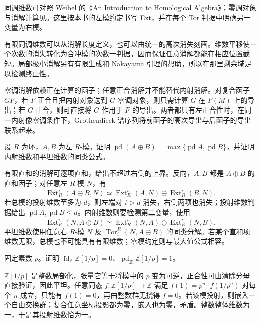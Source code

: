 \ProseParagraphBreak
同调维数可对照 Weibel 的《An Introduction to Homological Algebra》\cite[Section 4.1]{Weibel1994HomologicalAlgebra}；零调对象与消解计算见\cite[F-Acyclic Objects 2.4.3, Exercise 2.4.3, Section 2.5]{Weibel1994HomologicalAlgebra}。这里按本书的左模约定书写 Ext，并在每个 Tor 判据中明确另一变量为右模。






\begin{chaptersummary}
	有限同调维数可以从消解长度定义，也可以由统一的高次消失刻画。维数平移使一个次数的消失转化为合冲模的次数一判据，因而保证任意消解都能在相应位置截短。局部极小消解另有有限生成和 Nakayama 引理的帮助，所以在那里剩余域足以检测终止性。

	\ProseParagraphBreak
	零调消解依赖正在计算的函子；任意正合消解并不能替代内射消解。对复合函子 \(GF\)，若 \(F\) 正合且把内射对象送到 \(G\)-零调对象，则只需计算 \(G\) 在 \(F(M)\) 上的导出；若 \(G\) 正合，则可直接将 \(G\) 作用于 \(F\) 的导出。两者都只有左正合性时，在同一内射像零调条件下，Grothendieck 谱序列将前函子的高次导出与后函子的导出联系起来。
\end{chaptersummary}

\BookExercises

\begin{exercise}\label{b4:ex:10-dimension-summands}
	设 \(R\) 为环，\(A,B\) 为左 \(R\)-模。证明 \(\operatorname{pd}(A\oplus B)=\max\{\operatorname{pd}A,\operatorname{pd}B\}\)，并证明内射维数和平坦维数的同类公式。
\end{exercise}
\begin{solution}
	有限直和的消解可逐项直和，给出不超过右侧的上界。反向，\(A,B\) 都是 \(A\oplus B\) 的直和因子；对任意左 \(R\)-模 \(N\)，有
	\[
		\operatorname{Ext}_R^i(A\oplus B,N) \simeq\operatorname{Ext}_R^i(A,N)\oplus\operatorname{Ext}_R^i(B,N).
	\]
	若总模的投射维数至多为 \(d\)，则左端对 \(i>d\) 消失，右侧两项也消失；投射维数判据给出 \(\operatorname{pd}A,\operatorname{pd}B\le d\)。内射维数则要检测第二变量，使用
	\[
		\operatorname{Ext}_R^i(N,A\oplus B) \simeq\operatorname{Ext}_R^i(N,A)\oplus\operatorname{Ext}_R^i(N,B).
	\]
	平坦维数使用任意右 \(R\)-模 \(N\) 及 \(\operatorname{Tor}_i^R(N,A\oplus B)\) 的同类分解。若某个直和项维数无限，总模也不可能具有有限维数；零模约定则与最大值公式相容。
\end{solution}

\begin{exercise}\label{b4:ex:10-flat-not-projective}
	固定素数 \(p\)。证明 \(\operatorname{fd}_{\mathbb Z}\mathbb Z[1/p]=0\)、\(\operatorname{pd}_{\mathbb Z}\mathbb Z[1/p]=1\)。
\end{exercise}
\begin{solution}
	\(\mathbb Z[1/p]\) 是整数局部化，张量它等于将模中的 \(p\) 变为可逆，正合性可由清除分母直接验证，因此平坦。任意同态 \(f:\mathbb Z[1/p]\to\mathbb Z\) 满足 \(f(1)=p^n\cdot f(1/p^n)\) 对每个 \(n\) 成立，只能有 \(f(1)=0\)，再由整数群无挠得 \(f=0\)。若该模投射，则嵌入一个自由交换群；复合任意坐标投影都为零，嵌入也为零，矛盾。整数整体维数为一，于是其投射维数恰为一。
\end{solution}

